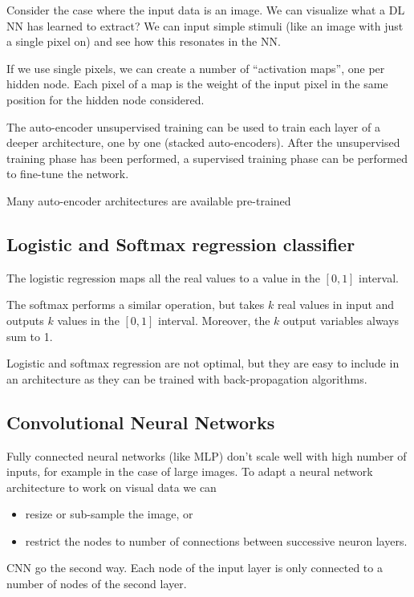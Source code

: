 \documentclass[oneside,onecolumn]{report}
\begin{document}
Consider the case where the input data is an image.
We can visualize what a DL NN has learned to extract?
We can input simple stimuli (like an image with just a single pixel on) and see how this resonates in the NN.

If we use single pixels, we can create a number of ``activation maps'', one per hidden node.
Each pixel of a map is the weight of the input pixel in the same position for the hidden node considered.

The auto-encoder unsupervised training can be used to train each layer of a deeper architecture, one by one (stacked auto-encoders).
After the unsupervised training phase has been performed, a supervised training phase can be performed to fine-tune the network.

Many auto-encoder architectures are available pre-trained


\subsection{Logistic and Softmax regression classifier}
The logistic regression maps all the real values to a value in the $[0,1]$ interval.

The softmax performs a similar operation, but takes $k$ real values in input and outputs $k$ values in the $[0,1]$ interval.
Moreover, the $k$ output variables always sum to 1.

Logistic and softmax regression are not optimal, but they are easy to include in an architecture as they can be trained with back-propagation algorithms.




\subsection{Convolutional Neural Networks}
Fully connected neural networks (like MLP) don't scale well with high number of inputs, for example in the case of large images.
To adapt a neural network architecture to work on visual data we can
\begin{itemize}
    \item resize or sub-sample the image, or
    \item restrict the nodes to number of connections between successive neuron layers.
\end{itemize}

CNN go the second way.
Each node of the input layer is only connected to a number of nodes of the second layer.
\end{document}
